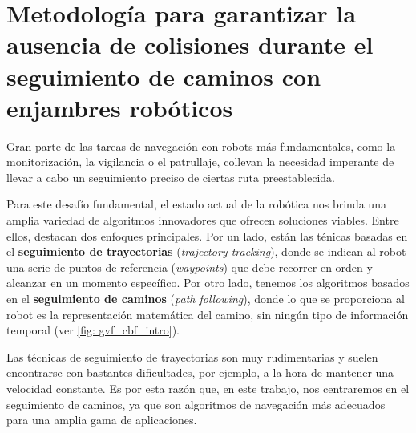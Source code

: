 \section{Metodología para garantizar la ausencia de colisiones durante el seguimiento de caminos con enjambres robóticos}

Gran parte de las tareas de navegación con robots más fundamentales, como la monitorización, la vigilancia o el patrullaje, collevan la necesidad imperante de llevar a cabo un seguimiento preciso de ciertas ruta preestablecida.

Para este desafío fundamental, el estado actual de la robótica nos brinda una amplia variedad de algoritmos innovadores que ofrecen soluciones viables. Entre ellos, destacan dos enfoques principales. Por un lado, están las ténicas basadas en el \textbf{seguimiento de trayectorias} (\textit{trajectory tracking}), donde se indican al robot una serie de puntos de referencia (\textit{waypoints}) que debe recorrer en orden y alcanzar en un momento específico. Por otro lado, tenemos los algoritmos basados en el \textbf{seguimiento de caminos} (\textit{path following}), donde lo que se proporciona al robot es la representación matemática del camino, sin ningún tipo de información temporal (ver \autoref{fig: gvf_cbf_intro}). 

Las técnicas de seguimiento de trayectorias son muy rudimentarias y suelen encontrarse con bastantes dificultades, por ejemplo, a la hora de mantener una velocidad constante. Es por esta razón que, en este trabajo, nos centraremos en el seguimiento de caminos, ya que son algoritmos de navegación más adecuados para una amplia gama de aplicaciones.

